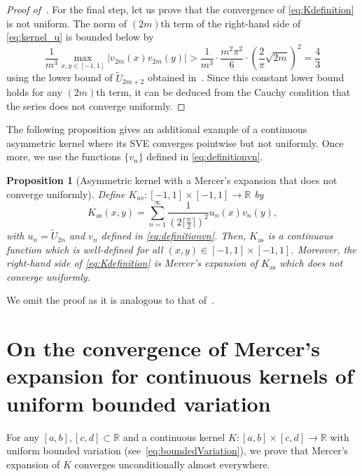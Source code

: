 \documentclass{article}
\newtheorem{proposition}{Proposition}
\begin{document}
\begin{proof}[Proof of~]
For the final step, let us prove that the convergence of \cref{eq:Kdefinition} is not uniform. The norm of $(2m)$th term of the right-hand side of \cref{eq:kernel_u} is bounded below by
\begin{equation*}
    \frac{1}{m^3}\max_{x,y\in[-1,1]}\left|v_{2m}(x)v_{2m}(y)\right| > \frac{1}{m^3} \cdot \frac{m^2\pi^2}{6} \cdot \left(\frac{2}{\pi} \sqrt{2m}\right)^2 = \frac{4}{3}
\end{equation*}
using the lower bound of $\tilde{U}_{2m+2}$ obtained in~. Since this constant lower bound holds for any $(2m)$th term, it can be deduced from the Cauchy condition that the series does not converge uniformly. 
\end{proof}

The following proposition gives an additional example of a continuous asymmetric kernel where its SVE converges pointwise but not uniformly. Once more, we use the functions $\{v_n\}$ defined in \cref{eq:definitionvn}. 

\begin{proposition}[Asymmetric kernel with a Mercer's expansion that does not converge uniformly]
Define $K_{as}:[-1, 1]\times[-1, 1]\to \mathbb{R}$ by
\begin{equation}\label{eq:Kdefinition}
    K_{\text{as}}(x, y) = \sum_{n=1}^\infty \frac{1}{(2\lceil \frac{n}{2}\rceil)^2} u_n(x) v_n(y),
\end{equation}
with $u_n = \tilde{U}_{2n}$ and $v_n$ defined in \cref{eq:definitionvn}. Then, $K_{\text{as}}$ is a continuous function which is well-defined for all $(x, y)\in[-1, 1]\times [-1, 1]$. Moreover, the right-hand side of \cref{eq:Kdefinition} is Mercer's expansion of $K_{\text{as}}$ which does not converge uniformly. 
\end{proposition}

We omit the proof as it is analogous to that of~. 

\section{On the convergence of Mercer's expansion for continuous kernels of uniform bounded variation}\label{sec:mainresultproof}

For any $[a,b],[c,d]\subset\mathbb{R}$ and a continuous kernel $K:[a,b]\times [c,d]\rightarrow\mathbb{R}$ with uniform bounded variation (see~\cref{eq:boundedVariation}), we prove that Mercer's expansion of $K$ converges unconditionally almost everywhere.
\end{document}
